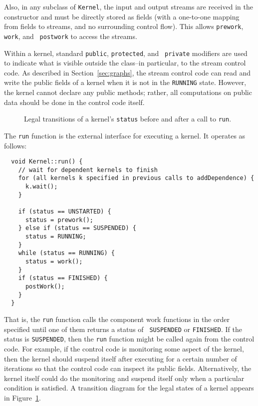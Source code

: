 Also, in any subclass of {\tt Kernel}, the input and output streams
are received in the constructor and must be directly stored as fields
(with a one-to-one mapping from fields to streams, and no surrounding
control flow).  This allows {\tt prework}, {\tt work}, and {\tt
postwork} to access the streams.

Within a kernel, standard {\tt public}, {\tt protected}, and {\tt
private} modifiers are used to indicate what is visible outside the
class--in particular, to the stream control code.  As described in
Section~\ref{sec:graphs}, the stream control code can read and write
the public fields of a kernel when it is not in the {\tt RUNNING}
state.  However, the kernel cannot declare any public methods; rather,
all computations on public data should be done in the control code
itself.


\begin{figure}[t]
\begin{center}
\end{center}
\vspace{-12pt}
\caption{Legal transitions of a kernel's {\tt status} before and after
a call to {\tt run}.\protect\label{fig:kernel-status}}
\end{figure}

The {\tt run} function is the external interface for executing a
kernel.  It operates as follows: 
{\small
\begin{verbatim}
  void Kernel::run() {
    // wait for dependent kernels to finish
    for (all kernels k specified in previous calls to addDependence) {
      k.wait();
    }

    if (status == UNSTARTED) {
      status = prework();
    } else if (status == SUSPENDED) {
      status = RUNNING;
    }
    while (status == RUNNING) {
      status = work();
    }
    if (status == FINISHED) {
      postWork();
    }
  } 
\end{verbatim}}
That is, the {\tt run} function calls the component work functions in
the order specified until one of them returns a status of {\tt
SUSPENDED} or {\tt FINISHED}.  If the status is {\tt SUSPENDED}, then
the {\tt run} function might be called again from the control code.
For example, if the control code is monitoring some aspect of the
kernel, then the kernel should suspend itself after executing for a
certain number of iterations so that the control code can inspect its
public fields.  Alternatively, the kernel itself could do the
monitoring and suspend itself only when a particular condition is
satisfied.  A transition diagram for the legal states of a kernel
appears in Figure~\ref{fig:kernel-status}.

